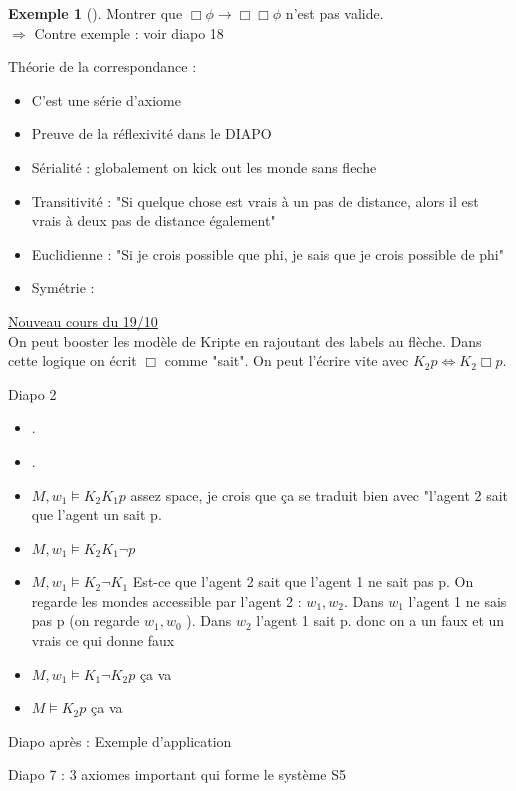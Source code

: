 \documentclass{article}
\theoremstyle{plain}%
\theoremstyle{definition}
\newtheorem{exmp}{Exemple}[section]
\theoremstyle{remark}
\begin{document}
\begin{exmp}[]
    Montrer que $ \Box \phi \rightarrow \Box \Box \phi  $ n'est pas valide. \\
    $\Rightarrow$ Contre exemple : voir diapo 18
\end{exmp}

Théorie de la correspondance : 
\begin{itemize}
    \item C'est une série d'axiome 
    \item Preuve de la réflexivité dans le DIAPO
    \item Sérialité : globalement on kick out les monde sans fleche 
    \item Transitivité : "Si quelque chose est vrais à un pas de distance, alors il est vrais à deux pas de distance également"
    \item Euclidienne : "Si je crois possible que phi, je sais que je crois possible de phi"
    \item Symétrie : 
\end{itemize}

\underline{Nouveau cours du 19/10} \\
On peut booster les modèle de Kripte en rajoutant des labels au flèche. Dans cette logique on écrit $ \Box  $ comme "sait". On peut l'écrire vite avec $ K_2p \Leftrightarrow K_2 \Box p $.

Diapo 2 \\
\begin{itemize}
    \item .
    \item .
    \item $ M, w_1 \models  K_2 K_1 p $ assez space, je crois que ça se traduit bien avec "l'agent 2 sait que l'agent un sait p.
    \item $ M, w_1 \models K_2 K_1 \lnot p $ 
    \item $ M, w_1 \models K_2 \lnot K_1 $ Est-ce que l'agent 2 sait que l'agent 1 ne sait pas p. On regarde les mondes accessible par l'agent 2 : $ w_1, w_2 $. Dans $ w_1 $ l'agent 1 ne sais pas p (on regarde $ w_1, w_0 $ ). Dans $ w_2 $ l'agent 1 sait p. donc on a un faux et un vrais ce qui donne faux
    \item $ M, w_1 \models K_1 \lnot K_2 p $ ça va 
    \item $ M \models K_2 p $ ça va
\end{itemize}

Diapo après : Exemple d'application 

Diapo 7 : 3 axiomes important qui forme le système S5
\end{document}
